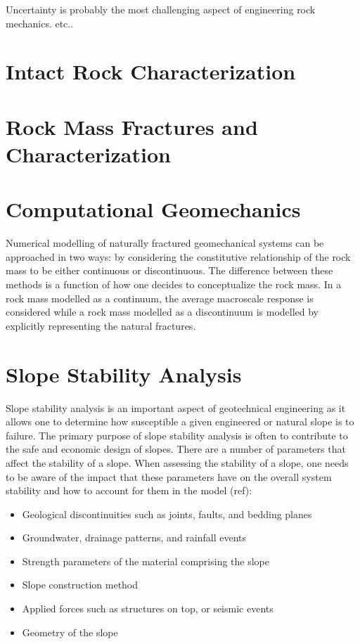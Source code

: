 Uncertainty is probably the most challenging aspect of engineering rock mechanics. etc..

\section{Intact Rock Characterization}

\section{Rock Mass Fractures and Characterization}

\section{Computational Geomechanics}

Numerical modelling of naturally fractured geomechanical systems can be approached in two ways: by considering the constitutive relationship of the rock mass to be either continuous or discontinuous. The difference between these methods is a function of how one decides to conceptualize the rock mass. In a rock mass modelled as a continuum, the average macroscale response is considered while a rock mass modelled as a discontinuum is modelled by explicitly representing the natural fractures. 

\section{Slope Stability Analysis}
Slope stability analysis is an important aspect of geotechnical engineering as it allows one to determine how susceptible a given engineered or natural slope is to failure. The primary purpose of slope stability analysis is often to contribute to the safe and economic design of slopes. There are a number of parameters that affect the stability of a slope. When assessing the stability of a slope, one needs to be aware of the impact that these parameters have on the overall system stability and how to account for them in the model (ref):

\begin{itemize}
\item Geological discontinuities such as joints, faults, and bedding planes
\item Groundwater, drainage patterns, and rainfall events
\item Strength parameters of the material comprising the slope
\item Slope construction method
\item Applied forces such as structures on top, or seismic events
\item Geometry of the slope
\end{itemize}

